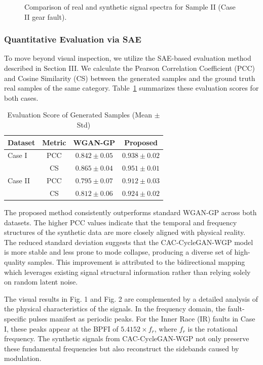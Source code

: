 \begin{figure}[htbp]
\centering
\caption{Comparison of real and synthetic signal spectra for Sample II (Case II gear fault).}
\label{fig:gen_quality_2}
\end{figure}

\subsubsection{Quantitative Evaluation via SAE}
To move beyond visual inspection, we utilize the SAE-based evaluation method described in Section III. We calculate the Pearson Correlation Coefficient (PCC) and Cosine Similarity (CS) between the generated samples and the ground truth real samples of the same category. Table~\ref{tab:gen_scores} summarizes these evaluation scores for both cases.

\begin{table}[htbp]
\centering
\caption{Evaluation Score of Generated Samples (Mean $\pm$ Std)}
\label{tab:gen_scores}
\begin{tabular}{lccc}
\hline
\textbf{Dataset} & \textbf{Metric} & \textbf{WGAN-GP} & \textbf{Proposed} \\ \hline
Case I & PCC & $0.842 \pm 0.05$ & $0.938 \pm 0.02$ \\
       & CS  & $0.865 \pm 0.04$ & $0.951 \pm 0.01$ \\ \hline
Case II & PCC & $0.795 \pm 0.07$ & $0.912 \pm 0.03$ \\
        & CS  & $0.812 \pm 0.06$ & $0.924 \pm 0.02$ \\
\hline
\end{tabular}
\end{table}

The proposed method consistently outperforms standard WGAN-GP across both datasets. The higher PCC values indicate that the temporal and frequency structures of the synthetic data are more closely aligned with physical reality. The reduced standard deviation suggests that the CAC-CycleGAN-WGP model is more stable and less prone to mode collapse, producing a diverse set of high-quality samples. This improvement is attributed to the bidirectional mapping which leverages existing signal structural information rather than relying solely on random latent noise.

The visual results in Fig. 1 and Fig. 2 are complemented by a detailed analysis of the physical characteristics of the signals. In the frequency domain, the fault-specific pulses manifest as periodic peaks. For the Inner Race (IR) faults in Case I, these peaks appear at the BPFI of $5.4152 \times f_r$, where $f_r$ is the rotational frequency. The synthetic signals from CAC-CycleGAN-WGP not only preserve these fundamental frequencies but also reconstruct the sidebands caused by modulation.

